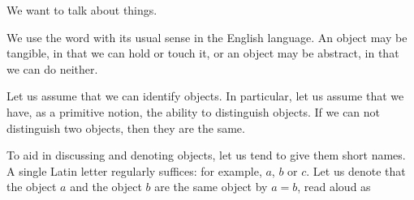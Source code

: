 
\sbasic



\sstart



We want to talk about things.


We use the word 
with its usual sense in the English
language.
An object may be tangible, in that
we can hold or touch it,
or an object may be abstract,
in that we can do neither.

Let us assume that we can
identify objects.
In particular, let us assume
that we have, as a primitive
notion, the ability
to distinguish objects.
If we can not distinguish
two objects, then they are
the same.


To aid in discussing and
denoting objects, let
us tend to give them
short names.
A single Latin
letter regularly suffices:
for example,
$a$, $b$ or $c$.
Let us denote that
the object $a$ and
the object $b$ are
the same object
by $a = b$,
read aloud as

\strats
